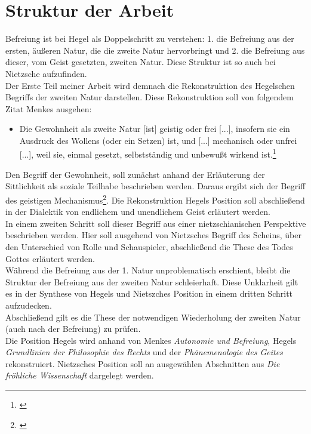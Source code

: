 \documentclass[a4paper, 12pt]{article}
\begin{document}
\section{Struktur der Arbeit}
Befreiung ist bei Hegel als Doppelschritt zu verstehen: 1. die Befreiung aus der ersten, äußeren Natur, die die zweite Natur hervorbringt und 2. die Befreiung aus dieser, vom Geist gesetzten, zweiten Natur.
Diese Struktur ist so auch bei Nietzsche aufzufinden.\\
Der Erste Teil meiner Arbeit wird demnach die Rekonstruktion des Hegelschen Begriffs der zweiten Natur darstellen. 
Diese Rekonstruktion soll von folgendem Zitat Menkes ausgehen: 
\begin{itemize}
    \item[] Die Gewohnheit als zweite Natur [ist] geistig oder frei [...], insofern sie ein Ausdruck des Wollens (oder ein Setzen) ist, und [...] mechanisch oder unfrei [...], weil sie, einmal gesetzt, selbstständig und unbewußt wirkend ist.\footnote{\citeauthor[][145]{menke_autonomie_2018}}
\end{itemize}
Den Begriff der Gewohnheit, soll zunächst anhand der Erläuterung der Sittlichkeit als soziale Teilhabe beschrieben werden. Daraus ergibt sich der Begriff des \glqq geistigen Mechanismus\grqq\footnote{\citeauthor[][S.145]{menke_autonomie_2018}}. Die Rekonstruktion Hegels Position soll abschließend in der Dialektik von endlichem und unendlichem Geist erläutert werden.\\
In einem zweiten Schritt soll dieser Begriff aus einer nietzschianischen Perspektive beschrieben werden. 
Hier soll ausgehend von Nietzsches Begriff des Scheins, über den Unterschied von Rolle und Schauspieler, abschließend die These des Todes Gottes erläutert werden.\\
Während die Befreiung aus der 1. Natur unproblematisch erschient, bleibt die Struktur der Befreiung aus der zweiten Natur schleierhaft.
Diese Unklarheit gilt es in der Synthese von Hegels und Nietszches Position in einem dritten Schritt aufzudecken.\\
Abschließend gilt es die These der notwendigen Wiederholung der zweiten Natur (auch nach der Befreiung) zu prüfen.\\

Die Position Hegels wird anhand von Menkes \textit{Autonomie und Befreiung}, Hegels \textit{Grundlinien der Philosophie des Rechts} und der \textit{Phänemenologie des Geites} rekonstruiert.
Nietzsches Position soll an ausgewählen Abschnitten aus \textit{Die fröhliche Wissenschaft} dargelegt werden.
\end{document}
